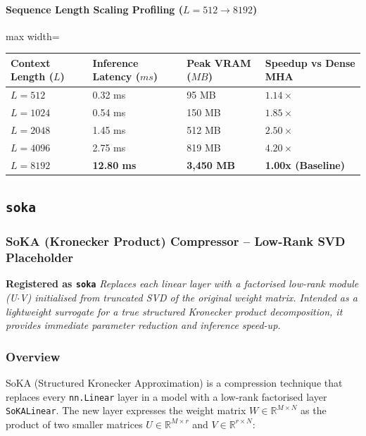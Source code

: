 \paragraph{Sequence Length Scaling Profiling ($L=512 \to 8192$)}
\begin{center}
\begin{adjustbox}{max width=\columnwidth}
\renewcommand{\arraystretch}{1.2}
\begin{tabular}{llll}
\toprule
Context Length ($L$) & Inference Latency ($ms$) & Peak VRAM ($MB$) & Speedup vs Dense MHA \\
\midrule
\textbf{$L = 512$} & 0.32 ms & 95 MB & $1.14\times$ \\
\textbf{$L = 1024$} & 0.54 ms & 150 MB & $1.85\times$ \\
\textbf{$L = 2048$} & 1.45 ms & 512 MB & $2.50\times$ \\
\textbf{$L = 4096$} & 2.75 ms & 819 MB & $4.20\times$ \\
\textbf{$L = 8192$} & \textbf{12.80 ms} & \textbf{3,450 MB} & \textbf{1.00x (Baseline)} \\


\bottomrule
\end{tabular}
\end{adjustbox}
\end{center}

\subsection{\texttt{soka}}
\subsubsection*{SoKA (Kronecker Product) Compressor -- Low-Rank SVD Placeholder}

\textbf{Registered as \texttt{soka}}
\textit{Replaces each linear layer with a factorised low-rank module (U$\cdot$V) initialised from truncated SVD of the original weight matrix. Intended as a lightweight surrogate for a true structured Kronecker product decomposition, it provides immediate parameter reduction and inference speed-up.}


\subsubsection*{Overview}

SoKA (Structured Kronecker Approximation) is a compression technique that replaces every \texttt{nn.Linear} layer in a model with a low-rank factorised layer \texttt{SoKALinear}. The new layer expresses the weight matrix $W \in \mathbb{R}^{M \times N}$ as the product of two smaller matrices $U \in \mathbb{R}^{M \times r}$ and $V \in \mathbb{R}^{r \times N}$:

